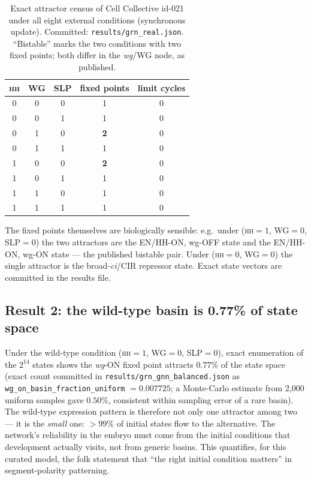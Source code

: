 \begin{table}[!htbp]
\centering
\caption{Exact attractor census of Cell Collective id-021 under all eight
external conditions (synchronous update). Committed:
\texttt{results/grn\_real.json}. ``Bistable'' marks the two conditions with
two fixed points; both differ in the \emph{wg}/WG node, as published.}
\label{tab:attractors}
\begin{tabular}{ccccc}
\toprule
\textsc{hh} & \textsc{WG} & \textsc{SLP} & fixed points & limit cycles \\
\midrule
0 & 0 & 0 & 1 & 0 \\
0 & 0 & 1 & 1 & 0 \\
0 & 1 & 0 & \textbf{2} & 0 \\
0 & 1 & 1 & 1 & 0 \\
1 & 0 & 0 & \textbf{2} & 0 \\
1 & 0 & 1 & 1 & 0 \\
1 & 1 & 0 & 1 & 0 \\
1 & 1 & 1 & 1 & 0 \\
\bottomrule
\end{tabular}
\end{table}

The fixed points themselves are biologically sensible: e.g.\ under
(\textsc{hh}$=1$, \textsc{WG}$=0$, \textsc{SLP}$=0$) the two attractors are
the EN/HH-ON, wg-OFF state and the EN/HH-ON, wg-ON state --- the published
bistable pair. Under (\textsc{hh}$=0$, \textsc{WG}$=0$) the single attractor
is the broad-\emph{ci}/CIR repressor state. Exact state vectors are committed
in the results file.

\subsection{Result 2: the wild-type basin is 0.77\% of state space}
\label{sec:basin}

Under the wild-type condition (\textsc{hh}$=1$, \textsc{WG}$=0$,
\textsc{SLP}$=0$), exact enumeration of the $2^{14}$ states shows the
\emph{wg}-ON fixed point attracts $0.77\%$ of the state space (exact count
committed in \texttt{results/grn\_gnn\_balanced.json} as
\texttt{wg\_on\_basin\_fraction\_uniform} $= 0.007725$; a Monte-Carlo estimate
from 2{,}000 uniform samples gave $0.50\%$, consistent within sampling error
of a rare basin). The wild-type expression pattern is therefore not only one
attractor among two --- it is the \emph{small} one: $> 99\%$ of initial
states flow to the alternative. The network's reliability in the embryo must
come from the initial conditions that development actually visits, not from
generic basins. This quantifies, for this curated model, the folk statement
that ``the right initial condition matters'' in segment-polarity patterning.

